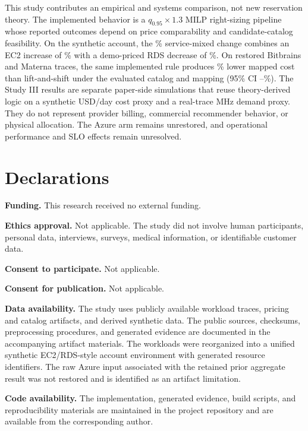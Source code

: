 \documentclass[11pt]{article}
\begin{document}
This study contributes an empirical and systems comparison, not new
reservation theory. The implemented behavior is a
\(q_{0.95}\times1.3\) MILP right-sizing pipeline whose reported outcomes
depend on price comparability and candidate-catalog feasibility. On the
synthetic account, the \evidAggregateDeltaPct\% service-mixed change combines
an EC2 increase of \evidEcTwoDeltaPct\% with a demo-priced RDS decrease of
\evidRdsSavingsPct\%. On restored Bitbrains and Materna traces, the same
implemented rule produces \extOverallSavingsPct\% lower mapped cost than
lift-and-shift under the evaluated catalog and mapping (95\% CI
\extOverallSavingsCiLow--\extOverallSavingsCiHigh\%). The Study III results
are separate paper-side simulations that reuse theory-derived logic on a
synthetic USD/day cost proxy and a real-trace MHz demand proxy. They do not
represent provider billing, commercial recommender behavior, or physical
allocation. The Azure arm remains unrestored, and operational performance and
SLO effects remain unresolved.

\section*{Declarations}

\textbf{Funding.} This research received no external funding.

\textbf{Ethics approval.} Not applicable. The study did not involve human
participants, personal data, interviews, surveys, medical information, or
identifiable customer data.

\textbf{Consent to participate.} Not applicable.

\textbf{Consent for publication.} Not applicable.

\textbf{Data availability.} The study uses publicly available workload traces,
pricing and catalog artifacts, and derived synthetic data. The public sources,
checksums, preprocessing procedures, and generated evidence are documented in
the accompanying artifact materials. The workloads were reorganized into a
unified synthetic EC2/RDS-style account environment with generated resource
identifiers. The raw Azure input associated with the retained prior aggregate
result was not restored and is identified as an artifact limitation.

\textbf{Code availability.} The implementation, generated evidence, build
scripts, and reproducibility materials are maintained in the project
repository and are available from the corresponding author.
\end{document}
